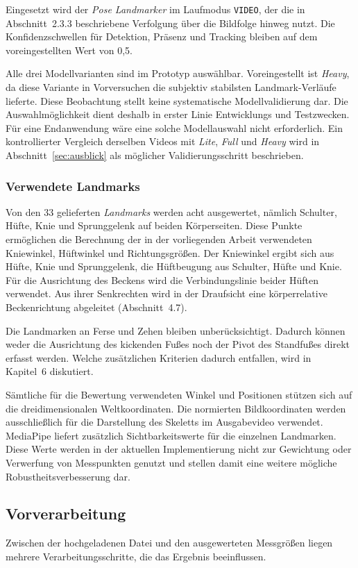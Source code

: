 \documentclass[intern]{cgMA}
\begin{document}
Eingesetzt wird der \textit{Pose Landmarker} im Laufmodus \texttt{VIDEO}, der die in Abschnitt~2.3.3 beschriebene Verfolgung über die Bildfolge hinweg nutzt. Die Konfidenzschwellen für Detektion, Präsenz und Tracking bleiben auf dem voreingestellten Wert von 0,5.

Alle drei Modellvarianten sind im Prototyp auswählbar. Voreingestellt ist \textit{Heavy}, da diese Variante in Vorversuchen die subjektiv stabilsten Landmark-Verläufe lieferte. Diese Beobachtung stellt keine systematische Modellvalidierung dar. Die Auswahlmöglichkeit dient deshalb in erster Linie Entwicklungs und Testzwecken. Für eine Endanwendung wäre eine solche Modellauswahl nicht erforderlich. Ein kontrollierter Vergleich derselben Videos mit \textit{Lite}, \textit{Full} und \textit{Heavy} wird in Abschnitt~\ref{sec:ausblick} als möglicher Validierungsschritt beschrieben.

\subsubsection{Verwendete Landmarks}
Von den 33 gelieferten \textit{Landmarks} werden acht ausgewertet, nämlich Schulter, Hüfte, Knie und Sprunggelenk auf beiden Körperseiten. Diese Punkte ermöglichen die Berechnung der in der vorliegenden Arbeit verwendeten Kniewinkel, Hüftwinkel und Richtungsgrößen. Der Kniewinkel ergibt sich aus Hüfte, Knie und Sprunggelenk, die Hüftbeugung aus Schulter, Hüfte und Knie. Für die Ausrichtung des Beckens wird die Verbindungslinie beider Hüften verwendet. Aus ihrer Senkrechten wird in der Draufsicht eine körperrelative Beckenrichtung abgeleitet (Abschnitt~4.7).

Die Landmarken an Ferse und Zehen bleiben unberücksichtigt. Dadurch können weder die Ausrichtung des kickenden Fußes noch der Pivot des Standfußes direkt erfasst werden. Welche zusätzlichen Kriterien dadurch entfallen, wird in Kapitel~6 diskutiert.

Sämtliche für die Bewertung verwendeten Winkel und Positionen stützen sich auf die dreidimensionalen Weltkoordinaten. Die normierten Bildkoordinaten werden ausschließlich für die Darstellung des Skeletts im Ausgabevideo verwendet. MediaPipe liefert zusätzlich Sichtbarkeitswerte für die einzelnen Landmarken. Diese Werte werden in der aktuellen Implementierung nicht zur Gewichtung oder Verwerfung von Messpunkten genutzt und stellen damit eine weitere mögliche Robustheitsverbesserung dar.

\subsection{Vorverarbeitung}
Zwischen der hochgeladenen Datei und den ausgewerteten Messgrößen liegen mehrere Verarbeitungsschritte, die das Ergebnis beeinflussen.
\end{document}
